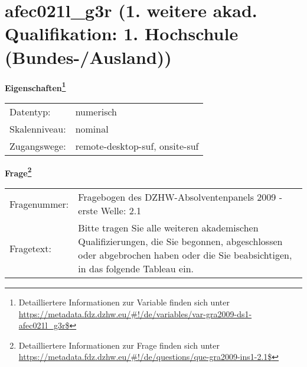 
    \setcounter{footnote}{0}

    \vspace*{-1.8cm}
	\section{afec021l\_g3r (1. weitere akad. Qualifikation: 1. Hochschule (Bundes-/Ausland))}
	\label{section:afec021l_g3r}



    \vspace*{0.5cm}
    \noindent\textbf{Eigenschaften\footnote{Detailliertere Informationen zur Variable finden sich unter
		\url{https://metadata.fdz.dzhw.eu/\#!/de/variables/var-gra2009-ds1-afec021l_g3r$}}}\\
	\begin{tabularx}{\hsize}{@{}lX}
	Datentyp: & numerisch \\
	Skalenniveau: & nominal \\
	Zugangswege: &
	  remote-desktop-suf, 
	  onsite-suf
 \\
    \end{tabularx}



				\vspace*{0.5cm}
                \noindent\textbf{Frage\footnote{Detailliertere Informationen zur Frage finden sich unter
		              \url{https://metadata.fdz.dzhw.eu/\#!/de/questions/que-gra2009-ins1-2.1$}}}\\
				\begin{tabularx}{\hsize}{@{}lX}
					Fragenummer: &
					  Fragebogen des DZHW-Absolventenpanels 2009 - erste Welle:
					  2.1
 \\
					Fragetext: & Bitte tragen Sie alle weiteren akademischen Qualifizierungen, die Sie begonnen, abgeschlossen oder abgebrochen haben oder die Sie beabsichtigen, in das folgende Tableau ein. \\
				\end{tabularx}





